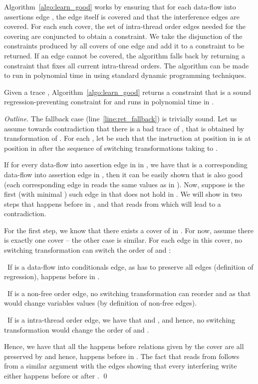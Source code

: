 \documentclass{llncs}
\begin{document}
Algorithm~\ref{algo:learn_good} works by ensuring that for each data-flow
into assertions edge , the edge itself is covered and that the
interference edges are covered.
For each such cover, the set of intra-thread order edges needed
for the covering are conjuncted to obtain a constraint.
We take the disjunction  of the constraints produced by all
covers of one edge and add it to a constraint  to
be returned.
If an edge cannot be covered, the algorithm falls back by returning a
constraint that fixes all current intra-thread orders.
The algorithm can be made to run in
polynomial time in  using standard dynamic
programming techniques.
\begin{theorem}
  \label{lem:learning_soundness}
  Given a trace , Algorithm~\ref{algo:learn_good} returns a
  constraint  that is a sound regression-preventing
  constraint for  and runs in polynomial time in .
\end{theorem}
\begin{proof}[Outline]
The fallback case (line~\ref{line:ret_fallback}) is trivially sound.
  Let us assume towards contradiction that there is a bad trace
   of
  , that is obtained by transformation of 
  .
  For each , let  be such that the instruction at
  position  in  is at position  in  after the
  sequence of switching transformations taking  to .

  If for every data-flow into assertion edge in  in
  , we have that  is a corresponding data-flow
  into assertion edge in , then it can be easily shown that
   is also good (each corresponding edge in  reads the
  same values as in ).
  Now, suppose  is the first (with minimal ) such edge in
   that does not hold in .
  We will show in two steps that  happens before  in ,
  and that  reads from  which will lead to a contradiction.

  For the first step, we know that there exists a cover of 
  in .
  For now, assume there is exactly one cover -- the other case is
  similar.
  For each edge  in this cover, no switching transformation
  can switch the order of  and :
  \begin{compactitem}
  \item~If  is a data-flow into conditionals edge,
    as  has to preserve all  edges (definition of
    regression), 
     happens before  in .
  \item~If  is a non-free order edge, no switching
    transformation can reorder  and  as that would change
    variables values (by definition of non-free edges).
  \item~If  is a intra-thread order edge, we have that  and , and hence, no
    switching transformation would change the order of  and .
  \end{compactitem}
  Hence, we have that all the happens before relations given by the
  cover are all preserved by  and hence,  happens before
   in .
The fact that  reads from  follows from a similar
  argument with the  edges
  showing that every interfering write either happens before  or
  after . 
\qed
\end{proof}
\end{document}
